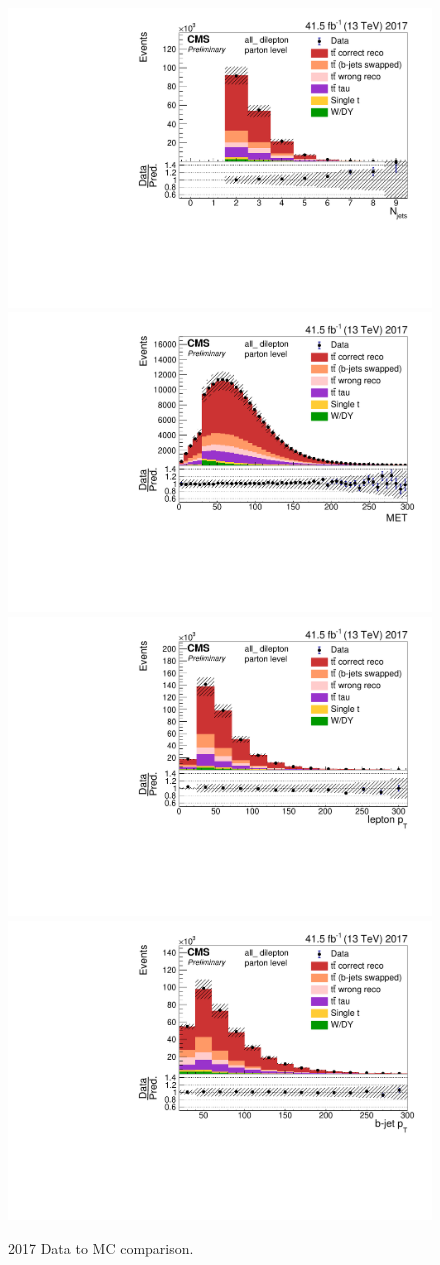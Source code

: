 \begin{figure}[h]
    \centering
    \includegraphics[width=.44\linewidth]{control/17_all_Njets.pdf}
    \includegraphics[width=.44\linewidth]{control/17_all_MET.pdf}
    \includegraphics[width=.44\linewidth]{control/17_all_lep_pt.pdf}
    \includegraphics[width=.44\linewidth]{control/17_all_bj_Pt.pdf}
    \caption{2017 Data to MC comparison. }
    \label{fig:dmcpre_17}
\end{figure}


